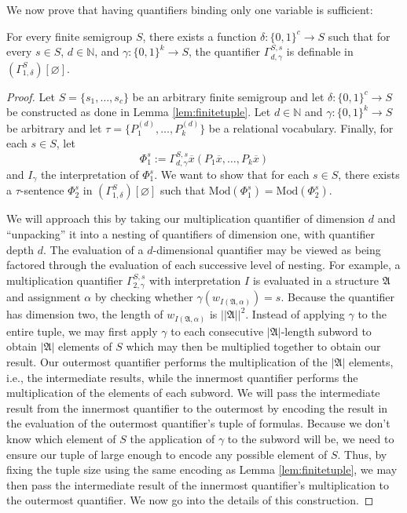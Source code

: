 \documentclass[a4paper,UKenglish,cleveref, autoref, thm-restate, anonymous]{lipics-v2021}
\begin{document}
We now prove that having quantifiers binding only one variable is sufficient:
\iffalse
\begin{theorem}
    For any finite semigroup $S$, if $Q = \{\mathfrak{A} \mid w_\mathfrak{A} \in L\}$ where $L$ is a language recognized by $S$, then for any sentence $Q_d(\varphi_1, \dots, \varphi_k)$, there is an 
\end{theorem}
\fi

\begin{theorem}\label{thm:finitebinding}
    For every finite semigroup $S$, there exists a function $\delta : \{0,1\}^c \rightarrow S$ such that for every $s \in S$, $d \in \mathbb{N}$, and $\gamma : \{0,1\}^k \rightarrow S$, the quantifier $\Gamma^{S,s}_{d,\gamma}$ is definable in $(\Gamma^{S}_{1,\delta})[\varnothing]$.
\end{theorem}
\begin{proof}
    Let $S = \{s_1, \dots, s_c\}$ be an arbitrary finite semigroup and let $\delta : \{0,1\}^c \rightarrow S$ be constructed as done in Lemma \ref{lem:finitetuple}. Let $d \in \mathbb{N}$ and $\gamma : \{0,1\}^k \rightarrow S$ be arbitrary and let $\tau = \{P_1^{(d)}, \dots, P_k^{(d)}\}$ be a relational vocabulary. Finally, for each $s \in S$, let \[
        \Phi_1^s := \Gamma^{S,s}_{d,\gamma}\overline{x}(P_1 \overline{x}, \dots, P_k \overline{x})
    \] and $I_\gamma$ the interpretation of $\Phi^s_1$. We want to show that for each $s \in S$, there exists a $\tau$-sentence $\Phi_2^s$ in $(\Gamma^S_{1,\delta})[\varnothing]$ such that $\text{Mod}(\Phi_1^s) = \text{Mod}(\Phi_2^s)$. 
    
    We will approach this by taking our multiplication quantifier of dimension $d$ and ``unpacking'' it into a nesting of quantifiers of dimension one, with quantifier depth $d$. The evaluation of a $d$-dimensional quantifier may be viewed as being factored through the evaluation of each successive level of nesting. For example, a multiplication quantifier $\Gamma^{S,s}_{2,\gamma}$ with interpretation $I$ is evaluated in a structure $\mathfrak{A}$ and assignment $\alpha$ by checking whether $\gamma(w_{I(\mathfrak{A},\alpha)}) = s$. Because the quantifier has dimension two, the length of $w_{I(\mathfrak{A},\alpha)}$ is $||\mathfrak{A}||^2$. Instead of applying $\gamma$ to the entire tuple, we may first apply $\gamma$ to each consecutive $|\mathfrak{A}|$-length subword to obtain $|\mathfrak{A}|$ elements of $S$ which may then be multiplied together to obtain our result. Our outermost quantifier performs the multiplication of the $|\mathfrak{A}|$ elements, i.e., the intermediate results, while the innermost quantifier performs the multiplication of the elements of each subword. We will pass the intermediate result from the innermost quantifier to the outermost by encoding the result in the evaluation of the outermost quantifier's tuple of formulas. Because we don't know which element of $S$ the application of $\gamma$ to the subword will be, we need to ensure our tuple of large enough to encode any possible element of $S$. Thus, by fixing the tuple size using the same encoding as Lemma \ref{lem:finitetuple}, we may then pass the intermediate result of the innermost quantifier's multiplication to the outermost quantifier. We now go into the details of this construction.


\end{proof}
\end{document}
